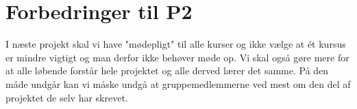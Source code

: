 \section{Forbedringer til P2}
I næste projekt skal vi have "mødepligt" til alle kurser og ikke vælge at ét kursus er mindre vigtigt og man derfor ikke behøver møde op. Vi skal også gøre mere for at alle løbende forstår hele projektet og alle derved lærer det samme. På den måde undgår kan vi måske undgå at gruppemedlemmerne ved mest om den del af projektet de selv har skrevet. 